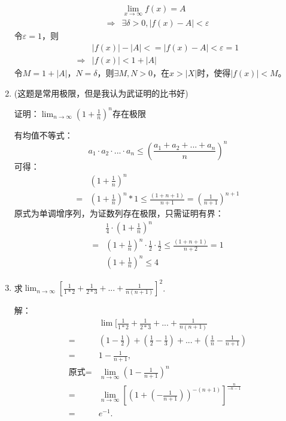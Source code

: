 \documentclass[UTF8]{ctexart}
\begin{document}
\begin{enumerate}
			\begin{equation}
				\begin{split}
					&\lim _{x\rightarrow \infty} f(x)=A \\
					\Rightarrow 
					&\exists \delta>0,|f(x)-A|<\varepsilon
				\end{split}
			\end{equation}
		令$\varepsilon=1$，则
			\begin{equation}
				\begin{split}
					&|f(x)|-|A|<=|f(x)-A|<\varepsilon=1\\
					\Rightarrow
					&|f(x)|<1+|A|
				\end{split}
			\end{equation}
			令$M=1+|A|$，$N=\delta$，则$\exists M,N>0$，在$x>|X|$时，使得$|f(x)|<M$。
			
			\item  (这题是常用极限，但是我认为武证明的比书好)
			
			证明：$\lim_{n\rightarrow \infty}(1+\frac{1}{n})^{n}$存在极限
			
			有均值不等式：
			$$
			a_1\cdot a_2\cdot...\cdot a_n \leq (
			\frac{a_1+a_2+...+a_n}{n})^n
			$$
			可得：
			\begin{equation}
				\begin{split}
					&(1+\frac{1}{n})^n \\
					=&(1+\frac{1}{n})^n*1 
					\leq\frac{(1+n+1)}{n+1}
					=(\frac{1}{n+1})^{n+1}
				\end{split}
			\end{equation}
			原式为单调增序列，为证数列存在极限，只需证明有界：
			\begin{equation}
				\begin{split}
					&\frac{1}{4}\cdot(1+\frac{1}{n})^n \\
					=&(1+\frac{1}{n})^n\cdot \frac{1}{2} \cdot \frac{1}{2}
					\leq\frac{(1+n+1)}{n+2}
					=1\\
					&(1+\frac{1}{n})^n\leq 4
				\end{split}
			\end{equation}
		
			\item 求$\lim_{n\rightarrow \infty} [\frac{1}{1*2}+\frac{1}{2*3}+...+\frac{1}{n(n+1)}]^2$.
			
			解：
			\begin{equation}
				\begin{split}
					&\lim [\frac{1}{1*2}+\frac{1}{2*3}+...+\frac{1}{n(n+1)}\\
					=&(1-\frac{1}{2})+(\frac{1}{2}-\frac{1}{3})+...+
					(\frac{1}{n}-\frac{1}{n+1})\\
					=&1-\frac{1}{n+1}, \\										
					\text{原式}=&\lim_{n\rightarrow \infty} (1-\frac{1}{n+1})^n \\
					=&\lim_{n\rightarrow \infty} [(1+(-\frac{1}{n+1}))^{-(n+1)}]
					^\frac{n}{-n-1} \\
					=&e^{-1}.
				\end{split}
			\end{equation}
		

\end{enumerate}
\end{document}
